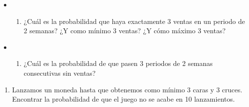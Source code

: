 \documentclass[
]{article}
\providecommand{\tightlist}{%
  \setlength{\itemsep}{0pt}\setlength{\parskip}{0pt}}
\begin{document}
\begin{itemize}
\item
  \begin{enumerate}
  \def\labelenumi{\alph{enumi})}
  \tightlist
  \item
    ¿Cuál es la probabilidad que haya exactamente 3 ventas en un periodo
    de 2 semanas? ¿Y como mínimo 3 ventas? ¿Y cómo máximo 3 ventas?
  \end{enumerate}
\item
  \begin{enumerate}
  \def\labelenumi{\alph{enumi})}
  \setcounter{enumi}{1}
  \tightlist
  \item
    ¿Cuál es la probabilidad de que pasen 3 periodos de 2 semanas
    consecutivas sin ventas?
  \end{enumerate}
\end{itemize}

\begin{enumerate}
\def\labelenumi{\arabic{enumi}.}
\setcounter{enumi}{8}
\tightlist
\item
  Lanzamos un moneda hasta que obtenemos como mínimo 3 caras y 3 cruces.
  Encontrar la probabilidad de que el juego no se acabe en 10
  lanzamientos.
\end{enumerate}
\end{document}
